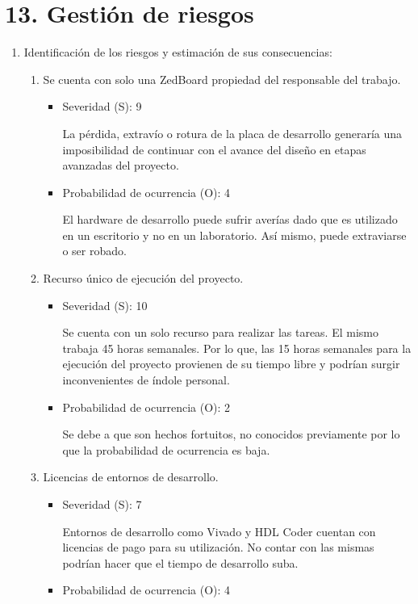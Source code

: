 \documentclass[
11pt, %
]{charter}
\begin{document}
\clearpage

\section{13. Gestión de riesgos}
\label{sec:riesgos}

\begin{enumerate}[]
	\item Identificación de los riesgos y estimación de sus consecuencias:
	\begin{enumerate}[$\text{Riesgo}$ 1:, leftmargin=*,align=left] 
		
		\item Se cuenta con solo una ZedBoard propiedad del responsable del trabajo.
		\begin{itemize}
			\item Severidad (S): 9
			
			La pérdida, extravío o rotura de la placa de desarrollo generaría una imposibilidad de continuar con el avance del diseño en etapas avanzadas del proyecto.
			\item Probabilidad de ocurrencia (O): 4
			
			El hardware de desarrollo puede sufrir averías dado que es utilizado en un escritorio y no en un laboratorio. Así mismo, puede extraviarse o ser robado.
		\end{itemize}

		\item Recurso único de ejecución del proyecto.
		\begin{itemize}
			\item Severidad (S): 10
			
			Se cuenta con un solo recurso para realizar las tareas. El mismo trabaja 45 horas semanales. Por lo que, las 15 horas semanales para la ejecución del proyecto provienen de su tiempo libre y podrían surgir inconvenientes de índole personal.
			\item Probabilidad de ocurrencia (O): 2
			
			Se debe a que son hechos fortuitos, no conocidos previamente por lo que la probabilidad de ocurrencia es baja.
		\end{itemize}

		\item Licencias de entornos de desarrollo.
		\begin{itemize}
			\item Severidad (S): 7
			
			Entornos de desarrollo como Vivado y HDL Coder cuentan con licencias de pago para su utilización. No contar con las mismas podrían hacer que el tiempo de desarrollo suba.
			\item Probabilidad de ocurrencia (O): 4
			

\end{itemize}
\end{enumerate}
\end{enumerate}
\end{document}
